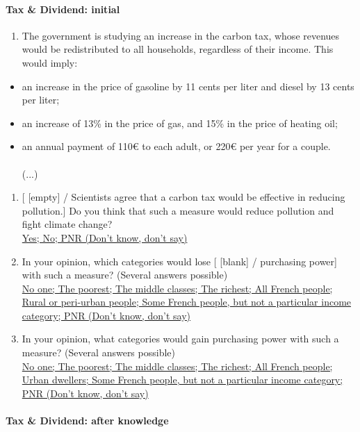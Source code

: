 \documentclass[english,5p,authoryear]{elsarticle}
\begin{document}
\begin{appendices}
\paragraph{Tax \& Dividend: initial}
\begin{enumerate}[resume,leftmargin=*]
\item The government is studying an increase in the carbon tax, whose revenues
would be redistributed to all households, regardless of their income.
This would imply: 
\end{enumerate}
\begin{itemize}
\item an increase in the price of gasoline by 11 cents per liter and diesel
by 13 cents per liter; 
\item an increase of 13\% in the price of gas, and 15\% in the price of
heating oil;
\item an annual payment of 110\euro{} to each adult, or 220\euro{} per year for a couple.
\\
\\
(...)
\end{itemize}
\begin{enumerate}[resume,leftmargin=*]
\item {[} {[}empty{]} / Scientists agree that a carbon tax would be effective
in reducing pollution.{]} Do you think that such a measure would reduce
pollution and fight climate change? \uline{}\\
\uline{Yes; No; PNR (Don't know, don't say)}
\item In your opinion, which categories would lose {[} {[}blank{]} / purchasing
power{]} with such a measure? (Several answers possible) \uline{}\\
\uline{No one; The poorest; The middle classes; The richest; All French
people; Rural or peri-urban people; Some French people, but not a
particular income category; PNR (Don't know, don't say)} 
\item In your opinion, what categories would gain purchasing power with
such a measure? (Several answers possible) \uline{}\\
\uline{No one; The poorest; The middle classes; The richest; All French
people; Urban dwellers; Some French people, but not a particular income
category; PNR (Don't know, don't say)} 
\end{enumerate}

\paragraph{Tax \& Dividend: after knowledge}


\end{appendices}
\end{document}
